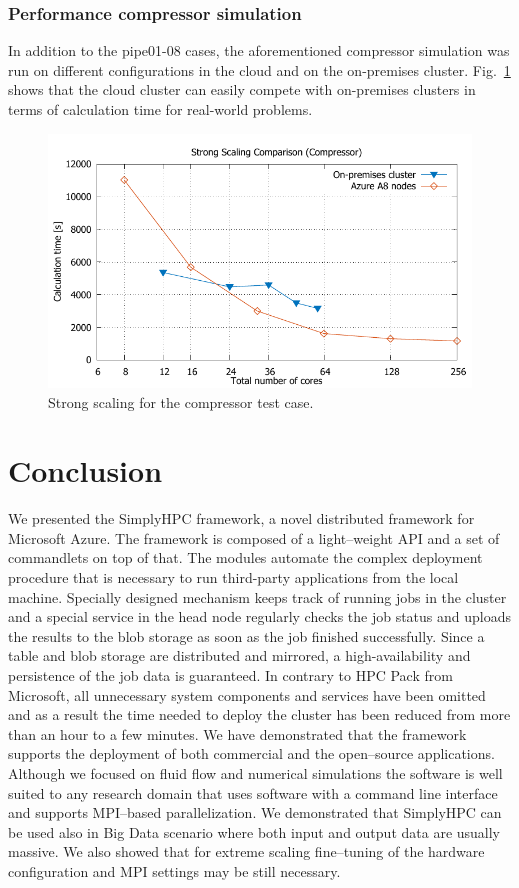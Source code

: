 \documentclass[3p,times]{elsarticle}
\begin{document}
\subsubsection{Performance compressor simulation}
In addition to the pipe01-08 cases, the aforementioned compressor simulation was run on different configurations in the cloud and on the on-premises cluster. Fig.~\ref{fig:scalingCompressor} shows that the cloud cluster can easily compete with on-premises clusters in terms of calculation time for real-world problems.

 
\begin{figure}
	\centering
	\includegraphics[width=0.5\linewidth]{gplt-compressor}
	\caption{Strong scaling for the compressor test case. }
	\label{fig:scalingCompressor}
\end{figure}

 
\section{Conclusion}
\label{sec:conclusions}

We presented the SimplyHPC framework, a novel distributed framework for Microsoft Azure. The framework is composed of a light--weight API and a set of commandlets on top of that. The modules automate the complex deployment procedure that is necessary to run third-party applications from the local machine. Specially designed mechanism keeps track of running jobs in the cluster and a special service in the head node regularly checks the job status and uploads the results to the blob storage as soon as the job finished successfully. Since a table and blob storage are distributed and mirrored, a high-availability and persistence of the job data is guaranteed. In contrary to HPC Pack from Microsoft, all unnecessary system components and services have been omitted and as a result the time needed to deploy the cluster has been reduced from more than an hour to a few minutes.  We have demonstrated that the framework supports the deployment of both commercial and the open--source applications. Although we focused on fluid flow and numerical simulations the software is well suited to any research domain that uses software with a command line interface and supports MPI--based parallelization. We demonstrated that SimplyHPC can be used also in Big Data scenario where both input and output data are usually massive. We also showed that for extreme scaling fine--tuning of the hardware configuration and MPI settings may be still necessary.
\end{document}
